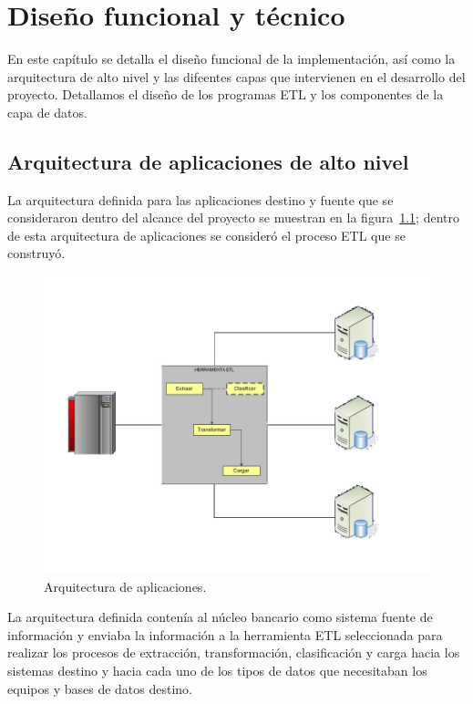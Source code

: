\chapter{Diseño funcional y técnico}
\label{cap:diseno-funcional}

En este capítulo se detalla el diseño funcional de la implementación, así como la arquitectura de alto nivel y las difeentes capas que intervienen en el desarrollo del proyecto.
Detallamos el diseño de los programas ETL y los componentes de la capa de datos.

\section{Arquitectura de aplicaciones de alto nivel}

La arquitectura definida para las aplicaciones destino y fuente que se
consideraron dentro del alcance del proyecto se muestran en la
figura~\ref{fig:arquitectura}; dentro de esta arquitectura de aplicaciones se
consideró el proceso ETL que se construyó.

\begin{figure}[htb]
  \begin{center}
    \includegraphics[width=0.7\linewidth]{Arquitectura.jpg}
        \caption{Arquitectura de aplicaciones.}
    \label{fig:arquitectura}
  \end{center}
\end{figure}

La arquitectura definida contenía al núcleo bancario como sistema fuente de
información y enviaba la información a la herramienta ETL seleccionada para
realizar los procesos de extracción, transformación, clasificación y carga hacia
los sistemas destino y hacia cada uno de los tipos de datos que necesitaban los
equipos y bases de datos destino.


